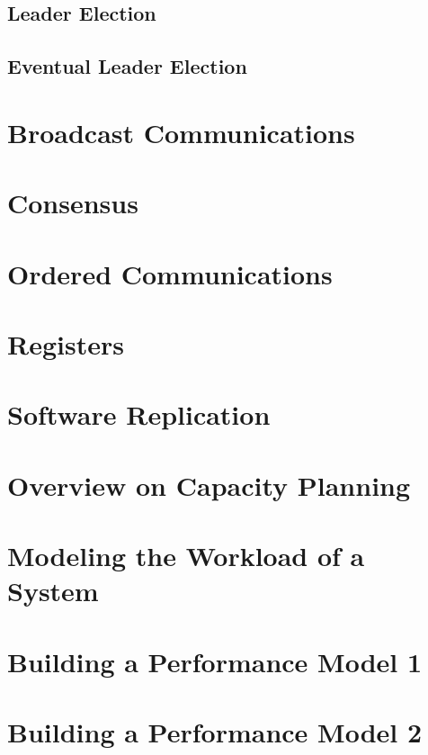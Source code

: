 \documentclass{article}
\begin{document}
	\subsection{Leader Election}
	
	\subsection{Eventual Leader Election}
	
	\newpage
	\section{Broadcast Communications}
	
	\newpage
	\section{Consensus}
	
	\newpage
	\section{Ordered Communications}
	
	\newpage
	\section{Registers}
	
	\newpage
	\section{Software Replication}
	
	\newpage
	\section{Overview on Capacity Planning}
	
	\newpage
	\section{Modeling the Workload of a System}
	
	\newpage
	\section{Building a Performance Model 1}
	
	\newpage
	\section{Building a Performance Model 2}
	
\end{document}
